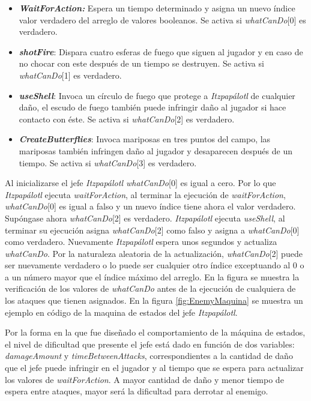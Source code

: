     \begin{itemize}
        \item \textbf{\textit{WaitForAction:}} Espera un tiempo determinado y asigna
        un nuevo índice valor verdadero del arreglo de valores booleanos. Se activa
        si \textit{whatCanDo}[0] es verdadero.
        \item \textbf{\textit{shotFire}}: Dispara cuatro esferas de fuego que siguen
        al jugador y en caso de no chocar con este después de un tiempo se destruyen.
        Se activa si \textit{whatCanDo}[1] es verdadero.
        \item \textbf{\textit{useShell}}: Invoca un círculo de fuego que protege a
        \textit{Itzpapálotl} de cualquier daño, el escudo de fuego también puede
        infringir daño al jugador si hace contacto con éste. Se activa si
        \textit{whatCanDo}[2] es verdadero.
        \item \textbf{\textit{CreateButterflies}}: Invoca mariposas en tres puntos
        del campo, las mariposas también infringen daño al jugador y desaparecen
        después de un tiempo. Se activa si \textit{whatCanDo}[3] es verdadero.
    \end{itemize}
Al inicializarse el jefe \textit{Itzpapálotl whatCanDo}[0] es igual a cero. Por
lo que \textit{Itzpapálotl} ejecuta \textit{waitForAction}, al terminar la
ejecución de \textit{waitForAction}, \textit{whatCanDo}[0] es igual a falso y un nuevo
índice tiene ahora el valor verdadero. Supóngase ahora \textit{whatCanDo}[2] es
verdadero. \textit{Itzpapálotl} ejecuta \textit{useShell}, al terminar su
ejecución asigna \textit{whatCanDo}[2] como falso y asigna a \textit{whatCanDo}[0]
como verdadero. Nuevamente \textit{Itzpapálotl} espera unos segundos y actualiza
\textit{whatCanDo}. Por la naturaleza aleatoria de la actualización,
\textit{whatCanDo}[2] puede ser nuevamente verdadero o lo puede ser cualquier
otro índice exceptuando al 0 o a un número mayor que el índice máximo del
arreglo. En la figura se muestra la verificación de los valores de
\textit{whatCanDo} antes de la ejecución de cualquiera de los ataques que
tienen asignados. En la figura \ref{fig:EnemyMaquina} se muestra un ejemplo en
código de la maquina de estados del jefe \textit{Itzpapálotl}.
\\
\par
Por la forma en la que fue diseñado el comportamiento de la máquina de estados,
el nivel de dificultad que presente el jefe está dado en función de dos variables:
\textit{damageAmount} y \textit{timeBetweenAttacks}, correspondientes a la
cantidad de daño que el jefe puede infringir en el jugador y al tiempo que se
espera para actualizar los valores de \textit{waitForAction}. A mayor cantidad
de daño y menor tiempo de espera entre ataques, mayor será la dificultad para
derrotar al enemigo.

